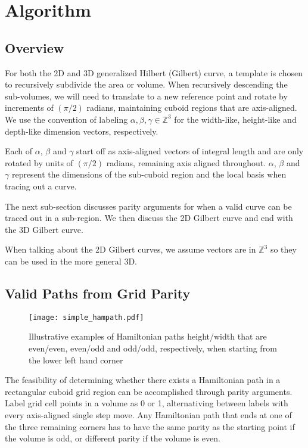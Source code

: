 \section{Algorithm}

\subsection{Overview}

For both the 2D and 3D generalized Hilbert (Gilbert) curve, a template is chosen
to recursively subdivide the area or volume.
When recursively descending the sub-volumes, we will need to translate to
a new reference point and rotate by increments of $(\pi/2)$ radians, maintaining
cuboid regions that are axis-aligned.
We use the convention of labeling $\alpha, \beta, \gamma \in \mathbb{Z}^3$ for
the width-like, height-like and depth-like dimension vectors, respectively.

Each of $\alpha$, $\beta$ and $\gamma$ start off as axis-aligned vectors of integral
length and are only rotated by units of $(\pi/2)$ radians, remaining axis aligned throughout.
$\alpha$, $\beta$ and $\gamma$ represent the dimensions of the sub-cuboid region
and the local basis when tracing out a curve.

The next sub-section discusses parity arguments for when a valid curve can be
traced out in a sub-region.
We then discuss the 2D Gilbert curve and end with the 3D Gilbert curve.

When talking about the 2D Gilbert curves, we assume vectors are in $\mathbb{Z}^3$
so they can be used in the more general 3D.


\subsection{Valid Paths from Grid Parity}

\begin{figure}[h]
  \centering
  \texttt{[image: simple\_hampath.pdf]}
  \caption{ Illustrative examples of Hamiltonian paths height/width that are even/even, even/odd and odd/odd, respectively,
            when starting from the lower left hand corner }
  \label{fig:exampleHampath}
\end{figure}


The feasibility of determining whether there exists a Hamiltonian path in a rectangular cuboid
grid region can be accomplished through parity arguments.
Label grid cell points in a volume as 0 or 1,
alternativing between labels with every axis-aligned single step move.
Any Hamiltonian path that ends at one of the three remaining corners has to have the same parity as the starting point if the
volume is odd, or different parity if the volume is even.

